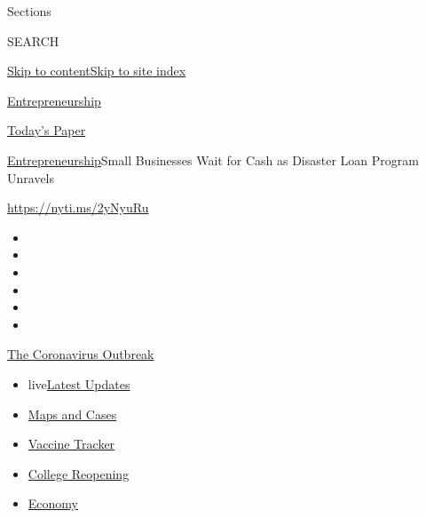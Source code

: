 Sections

SEARCH

\protect\hyperlink{site-content}{Skip to
content}\protect\hyperlink{site-index}{Skip to site index}

\href{https://www.nytimes.com/section/business/smallbusiness}{Entrepreneurship}

\href{https://myaccount.nytimes.com/auth/login?response_type=cookie\&client_id=vi}{}

\href{https://www.nytimes.com/section/todayspaper}{Today's Paper}

\href{/section/business/smallbusiness}{Entrepreneurship}\textbar{}Small
Businesses Wait for Cash as Disaster Loan Program Unravels

\url{https://nyti.ms/2yNyuRu}

\begin{itemize}
\item
\item
\item
\item
\item
\item
\end{itemize}

\href{https://www.nytimes.com/news-event/coronavirus?action=click\&pgtype=Article\&state=default\&region=TOP_BANNER\&context=storylines_menu}{The
Coronavirus Outbreak}

\begin{itemize}
\tightlist
\item
  live\href{https://www.nytimes.com/2020/08/03/world/coronavirus-covid-19.html?action=click\&pgtype=Article\&state=default\&region=TOP_BANNER\&context=storylines_menu}{Latest
  Updates}
\item
  \href{https://www.nytimes.com/interactive/2020/us/coronavirus-us-cases.html?action=click\&pgtype=Article\&state=default\&region=TOP_BANNER\&context=storylines_menu}{Maps
  and Cases}
\item
  \href{https://www.nytimes.com/interactive/2020/science/coronavirus-vaccine-tracker.html?action=click\&pgtype=Article\&state=default\&region=TOP_BANNER\&context=storylines_menu}{Vaccine
  Tracker}
\item
  \href{https://www.nytimes.com/2020/08/02/us/covid-college-reopening.html?action=click\&pgtype=Article\&state=default\&region=TOP_BANNER\&context=storylines_menu}{College
  Reopening}
\item
  \href{https://www.nytimes.com/live/2020/08/03/business/stock-market-today-coronavirus?action=click\&pgtype=Article\&state=default\&region=TOP_BANNER\&context=storylines_menu}{Economy}
\end{itemize}

